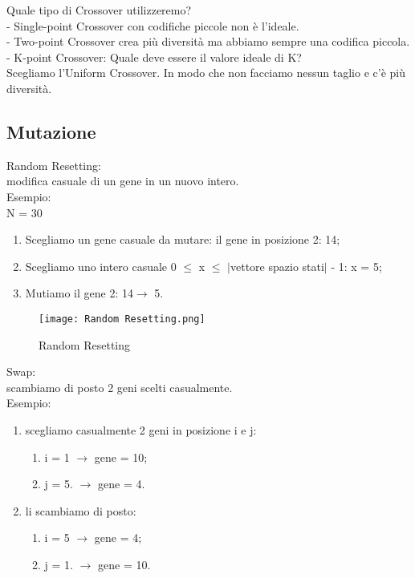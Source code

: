 \documentclass[10pt,a4paper]{article}
\begin{document}
    Quale tipo di Crossover utilizzeremo?\\
    - Single-point Crossover con codifiche piccole non è l’ideale.\\
    - Two-point Crossover crea più diversità ma abbiamo sempre una codifica piccola.\\
    - K-point Crossover: Quale deve essere il valore ideale di K?\\
    Scegliamo l’Uniform Crossover. In modo che non facciamo nessun taglio 
    e c’è più diversità.\\
    
  
    \subsection{Mutazione}
    \label{Mutazione}
    Random Resetting:\\
    modifica casuale di un gene in un nuovo intero.\\
    Esempio:\\
    N = 30\\
    \begin{enumerate}
      \item Scegliamo un gene casuale da mutare: il gene in posizione 2: 14;
      \item Scegliamo uno intero casuale 0 $\leq$ x $\leq$ $\mid$vettore spazio stati$\mid$ - 1: x = 5;
      \item Mutiamo il gene 2: 14$ \rightarrow$ 5.
    \end{enumerate}
    \begin{figure}[h!]
      \centering
      \caption{Random Resetting}
      \texttt{[image: Random Resetting.png]}
      \label{Random Resetting}
    \end{figure}
    
    Swap:\\
    scambiamo di posto 2 geni scelti casualmente.\\
    Esempio:\\
    \begin{enumerate}
    	\item scegliamo casualmente 2 geni in posizione i e j: 
    	\begin{enumerate}
    		\item i = 1 $\rightarrow$ gene =  10;
    		\item j = 5. $\rightarrow$ gene = 4.
    	\end{enumerate}
    	\item li scambiamo di posto:
    	\begin{enumerate}
    		\item i = 5 $\rightarrow$ gene = 4;
    		\item j = 1. $\rightarrow$ gene = 10.
    	\end{enumerate}
    \end{enumerate}
    
\end{document}
